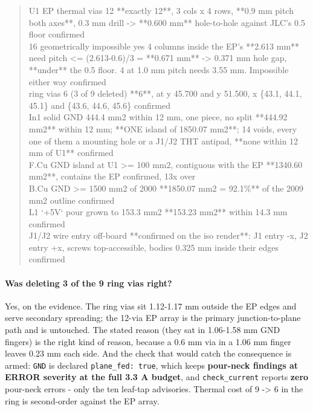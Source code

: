 \documentclass[11pt,a4paper]{article}
\begin{document}
\begin{quote}
\textbar{} U1 EP thermal vias \textbar{} 12 \textbar{} {*}{*}exactly 12{*}{*}, 3 cols x 4 rows, {*}{*}0.9 mm pitch both axes{*}{*}, 0.3 mm drill -\textgreater{} {*}{*}0.600 mm{*}{*} hole-to-hole against JLC's 0.5 floor \textbar{} confirmed \textbar{}\\
\textbar{} 16 geometrically impossible \textbar{} yes \textbar{} 4 columns inside the EP's {*}{*}2.613 mm{*}{*} need pitch \textless{}= (2.613-0.6)/3 = {*}{*}0.671 mm{*}{*} -\textgreater{} 0.371 mm hole gap, {*}{*}under{*}{*} the 0.5 floor. 4 at 1.0 mm pitch needs 3.55 mm. Impossible either way \textbar{} confirmed \textbar{}\\
\textbar{} ring vias \textbar{} 6 (3 of 9 deleted) \textbar{} {*}{*}6{*}{*}, at y 45.700 and y 51.500, x \{43.1, 44.1, 45.1\} and \{43.6, 44.6, 45.6\} \textbar{} confirmed \textbar{}\\
\textbar{} In1 solid GND \textbar{} 444.4 mm2 within 12 mm, one piece, no split \textbar{} {*}{*}444.92 mm2{*}{*} within 12 mm; {*}{*}ONE island of 1850.07 mm2{*}{*}; 14 voids, every one of them a mounting hole or a J1/J2 THT antipad, {*}{*}none within 12 mm of U1{*}{*} \textbar{} confirmed \textbar{}\\
\textbar{} F.Cu GND island at U1 \textbar{} \textgreater{}= 100 mm2, contiguous with the EP \textbar{} {*}{*}1340.60 mm2{*}{*}, contains the EP \textbar{} confirmed, 13x over \textbar{}\\
\textbar{} B.Cu GND \textbar{} \textgreater{}= 1500 mm2 of 2000 \textbar{} {*}{*}1850.07 mm2 = 92.1\%{*}{*} of the 2009 mm2 outline \textbar{} confirmed \textbar{}\\
\textbar{} L1 `+5V` pour \textbar{} grown to 153.3 mm2 \textbar{} {*}{*}153.23 mm2{*}{*} within 14.3 mm \textbar{} confirmed \textbar{}\\
\textbar{} J1/J2 wire entry \textbar{} off-board \textbar{} {*}{*}confirmed on the iso render{*}{*}: J1 entry -x, J2 entry +x, screws top-accessible, bodies 0.325 mm inside their edges \textbar{} confirmed \textbar{}
\end{quote}
\paragraph*{Was deleting 3 of the 9 ring vias right?}
Yes, on the evidence. The ring vias sit 1.12-1.17 mm outside the EP edges and serve secondary spreading; the 12-via EP array is the primary junction-to-plane path and is untouched. The stated reason (they sat in 1.06-1.58 mm GND fingers) is the right kind of reason, because a 0.6 mm via in a 1.06 mm finger leaves 0.23 mm each side. And the check that would catch the consequence is armed: \texttt{GND} is declared \texttt{plane\_fed: true}, which keeps \textbf{pour-neck findings at ERROR severity at the full 3.3 A budget}, and \texttt{check\_current} reports \textbf{zero} pour-neck errors - only the ten leaf-tap advisories. Thermal cost of 9 -\textgreater{} 6 in the ring is second-order against the EP array.
\end{document}
